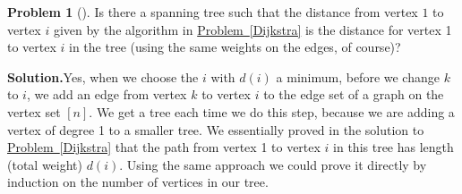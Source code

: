 \documentclass[10pt,]{book}
\theoremstyle{plain}
\theoremstyle{definition}
\newtheorem{activity}[project]{Problem}
\theoremstyle{definition}
\numberwithin{equation}{chapter}
\begin{document}
\begin{activity}[]\label{activity-121}
Is there a spanning tree such that the distance from vertex \(1\) to vertex \(i\) given by the algorithm in \hyperref[Dijkstra]{Problem~\ref{Dijkstra}} is the distance for vertex 1 to vertex \(i\) in the tree (using the same weights on the edges, of course)?%
\par\medskip\noindent%
\textbf{Solution.}\quad Yes, when we choose the \(i\) with \(d(i)\) a minimum, before we change \(k\) to \(i\), we add an edge from vertex \(k\) to vertex \(i\) to the edge set of a graph on the vertex set \([n]\). We get a tree each time we do this step, because we are adding a vertex of degree 1 to a smaller tree. We essentially proved in the solution to \hyperref[Dijkstra]{Problem~\ref{Dijkstra}} that the path from vertex 1 to vertex \(i\) in this tree has length (total weight) \(d(i)\). Using the same approach we could prove it directly by induction on the number of vertices in our tree.%
\end{activity}
\typeout{************************************************}
\typeout{************************************************}
\end{document}
